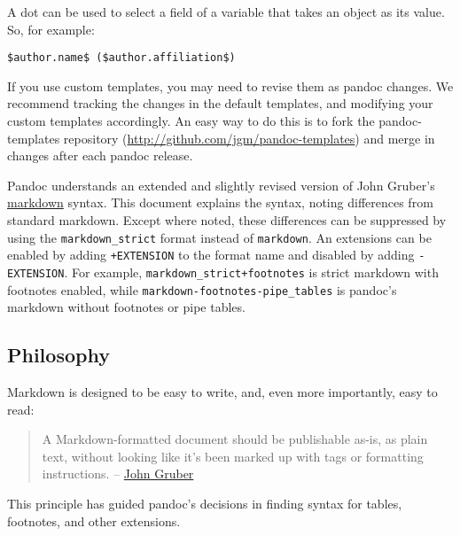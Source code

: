 \documentclass[]{article}
\begin{document}
A dot can be used to select a field of a variable that takes an object
as its value. So, for example:

\begin{verbatim}
$author.name$ ($author.affiliation$)
\end{verbatim}

If you use custom templates, you may need to revise them as pandoc
changes. We recommend tracking the changes in the default templates, and
modifying your custom templates accordingly. An easy way to do this is
to fork the pandoc-templates repository
(\url{http://github.com/jgm/pandoc-templates}) and merge in changes
after each pandoc release.


Pandoc understands an extended and slightly revised version of John
Gruber's \href{http://daringfireball.net/projects/markdown/}{markdown}
syntax. This document explains the syntax, noting differences from
standard markdown. Except where noted, these differences can be
suppressed by using the \texttt{markdown\_strict} format instead of
\texttt{markdown}. An extensions can be enabled by adding
\texttt{+EXTENSION} to the format name and disabled by adding
\texttt{-EXTENSION}. For example, \texttt{markdown\_strict+footnotes} is
strict markdown with footnotes enabled, while
\texttt{markdown-footnotes-pipe\_tables} is pandoc's markdown without
footnotes or pipe tables.

\subsection{Philosophy}

Markdown is designed to be easy to write, and, even more importantly,
easy to read:

\begin{quote}
A Markdown-formatted document should be publishable as-is, as plain
text, without looking like it's been marked up with tags or formatting
instructions. --
\href{http://daringfireball.net/projects/markdown/syntax\#philosophy}{John
Gruber}
\end{quote}

This principle has guided pandoc's decisions in finding syntax for
tables, footnotes, and other extensions.
\end{document}
